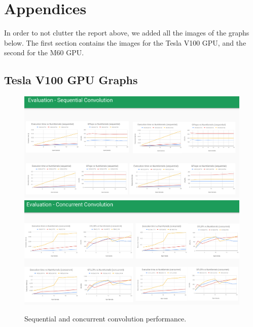 \documentclass[sigconf]{acmart}
\begin{document}
\section{Appendices}

In order to not clutter the report above, we added all the images of the graphs below. The first section contains the 
images for the Tesla V100 GPU, and the second for the M60 GPU. 

\subsection{Tesla V100 GPU Graphs}

\begin{figure}[htb]
  \centering
  \includegraphics[width=\textwidth]{img/seq-conv}
  \includegraphics[width=\textwidth]{img/conc-conv}
  \caption{Sequential and concurrent convolution performance.}
\end{figure}
\end{document}
